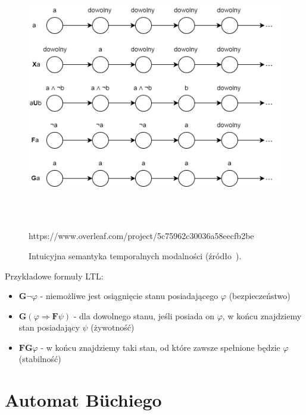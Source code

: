 \begin{figure}[h]
    \centering
    \includegraphics[height=11cm,keepaspectratio]{img/ltl_intuitive_semantics.png}
    \caption{Intuicyjna semantyka temporalnych modalności (źródło~\cite{Bai08}).}
    \label{fig:ltl_semantics}https://www.overleaf.com/project/5c75962c30036a58eecfb2be
\end{figure}

Przykładowe formuły LTL:
\begin{itemize}
\item $\mathbf{G}\neg\varphi$ - niemożliwe jest osiągnięcie stanu posiadającego $\varphi$ (bezpieczeństwo)
\item $\mathbf{G}(\varphi\Rightarrow\mathbf{F}\psi)$ - dla dowolnego stanu, jeśli posiada on $\varphi$, w końcu znajdziemy stan posiadający $\psi$ (żywotność)
\item $\mathbf{FG}\varphi$ - w końcu znajdziemy taki stan, od które zawsze spełnione będzie $\varphi$ (stabilność)
\end{itemize}


\section{Automat Büchiego}

